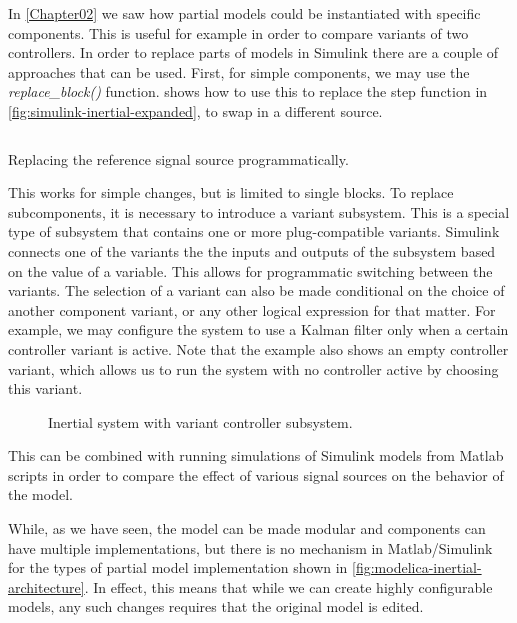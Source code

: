 \documentclass[\rootfolder/main.tex]{subfiles}
\begin{document}
In \cref{Chapter02} we saw how partial models could be instantiated with specific components.
This is useful for example in order to compare variants of two controllers.
In order to replace parts of models in Simulink there are a couple of approaches that can be used.
First, for simple components, we may use the \emph{replace\_block()} function.
 shows how to use this to replace the step function in \cref{fig:simulink-inertial-expanded}, to swap in a different source.

\begin{listing}[ht]
    \inputminted{matlab}{\rootfolder/Models/Matlab/ReplaceSource.m}
    \caption{Replacing the reference signal source programmatically.\label{lst:matlab-replace}}
\end{listing}

This works for simple changes, but is limited to single blocks.
To replace subcomponents, it is necessary to introduce a variant subsystem.
This is a special type of subsystem that contains one or more plug-compatible variants.
Simulink connects one of the variants the the inputs and outputs of the subsystem based on the value of a variable.
This allows for programmatic switching between the variants.
The selection of a variant can also be made conditional on the choice of another component variant, or any other logical expression for that matter.
For example, we may configure the system to use a Kalman filter only when a certain controller variant is active.
Note that the example also shows an empty controller variant, which allows us to run the system with no controller active by choosing this variant.

\begin{figure}[ht]
    \caption{Inertial system with variant controller subsystem.\label{fig:simscape-inertial-blowup}}
\end{figure}

This can be combined with running simulations of Simulink models from Matlab scripts in order to compare the effect of various signal sources on the behavior of the model.

While, as we have seen, the model can be made modular and components can have multiple implementations, but there is no mechanism in Matlab/Simulink for
the types of partial model implementation shown in \cref{fig:modelica-inertial-architecture}.
In effect, this means that while we can create highly configurable models, any such changes requires that the original model is edited.
\end{document}

